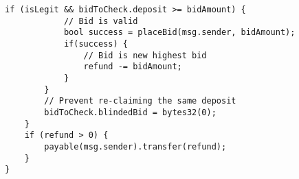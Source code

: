 \begin{lstlisting}[language=Solidity]
        if (isLegit && bidToCheck.deposit >= bidAmount) {
            // Bid is valid
            bool success = placeBid(msg.sender, bidAmount);
            if(success) {
                // Bid is new highest bid
                refund -= bidAmount;
            }
        }
        // Prevent re-claiming the same deposit
      	bidToCheck.blindedBid = bytes32(0);
    }
    if (refund > 0) {
        payable(msg.sender).transfer(refund);
    }
}
\end{lstlisting}